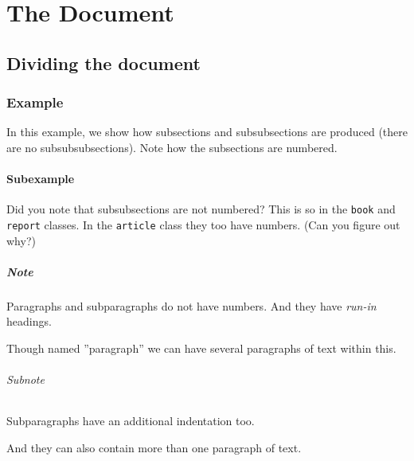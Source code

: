 \documentclass[a4paper, 10pt]{article}
\begin{document}
\chapter{The Document}
\section{Dividing the document}
\subsection{Example}
In this example, we show how subsections and subsubsections are produced
(there are no subsubsubsections). Note how the subsections are numbered.
\subsubsection{Subexample}
Did you note that subsubsections are not numbered? This is so in the \texttt{book}
and \texttt{report} classes. In the \texttt{article} class they too have numbers.
(Can you figure out why?)
\paragraph{Note}
Paragraphs and subparagraphs do not have numbers. And they have \textit{run-in} headings.

Though named ''paragraph'' we can have several paragraphs of text within this.

\subparagraph{Subnote}
Subparagraphs have an additional indentation too.

And they can also contain more than one paragraph of text.
\end{document}
